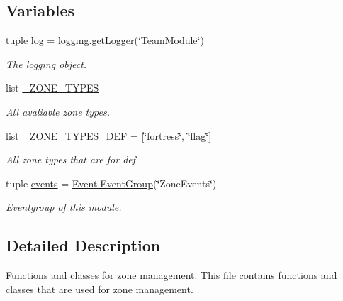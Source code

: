 \subsection*{Variables}
\begin{DoxyCompactItemize}
\item 
tuple \hyperlink{namespace_zone_aad90704d2c88929bd92b7acf2b9a09d6}{log} = logging.getLogger(\char`\"{}TeamModule\char`\"{})
\begin{DoxyCompactList}\small\item\em The logging object. \item\end{DoxyCompactList}\item 
list \hyperlink{namespace_zone_a8dcf5d84aac63b42f1ce7684c3b4ea91}{\_\-ZONE\_\-TYPES}
\begin{DoxyCompactList}\small\item\em All avaliable zone types. \item\end{DoxyCompactList}\item 
list \hyperlink{namespace_zone_aad0e42e8c895a1cedce5321c83a677b8}{\_\-ZONE\_\-TYPES\_\-DEF} = \mbox{[}\char`\"{}fortress\char`\"{}, \char`\"{}flag\char`\"{}\mbox{]}
\begin{DoxyCompactList}\small\item\em All zone types that are for def. \item\end{DoxyCompactList}\item 
tuple \hyperlink{namespace_zone_a2cf3edd088ca6482872ba018b81ef52a}{events} = \hyperlink{class_event_1_1_event_group}{Event.EventGroup}(\char`\"{}ZoneEvents\char`\"{})
\begin{DoxyCompactList}\small\item\em Eventgroup of this module. \item\end{DoxyCompactList}\end{DoxyCompactItemize}


\subsection{Detailed Description}
Functions and classes for zone management. This file contains functions and classes that are used for zone management. 

